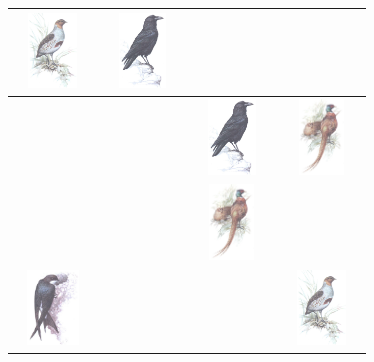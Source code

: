 \documentclass[a4paper,12pt,twoside]{article}
\begin{document}
\begin{figure}[H]
\begin{center}
\begin{tabular}{||p{2cm}|p{2cm}||p{2cm}|p{2cm}||} 
\hline \hline
\centerline{\includegraphics[width=2cm, height=20mm]{kuropatwa}} &\centerline{\includegraphics[width=2cm, height=20mm]{kruk}} & &\\\hline
& &\centerline{\includegraphics[width=2cm, height=20mm]{kruk}} & \centerline{\includegraphics[width=2cm, height=20mm]{bazant-lowny}} \\ \hline \hline
& & \centerline{\includegraphics[width=2cm, height=20mm]{bazant-lowny}} &  \\ \hline
\centerline{\includegraphics[width=2cm, height=20mm]{jaskolka-oknowka}} & & &
\centerline{\includegraphics[width=2cm, height=20mm]{kuropatwa}} \\ \hline \hline
\end{tabular}
\end{center}
\caption{\color{green}{Sudoku obrazkowe 2x2}}
\label{fig:sudoku}
\end{figure}
\newpage
\listoffigures
\end{document}
